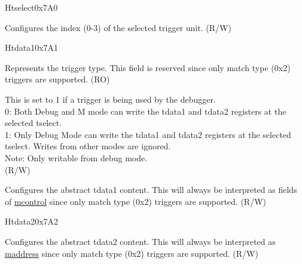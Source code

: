 \begin{register}{H}{tselect}{0x7A0}\label{regdesc:TSELECT}
%
%
\regnewline%
\begin{regdesc}\begin{reglist}
\label{fielddesc:TSELECT}\item [tselect] Configures the index (0-3) of the selected trigger unit. (R/W)
\end{reglist}\end{regdesc}
\end{register}

\begin{register}{H}{tdata1}{0x7A1}\label{regdesc:TDATA1}
%
%
%
\regnewline%
\begin{regdesc}\begin{reglist}
\label{fielddesc:TDATA1TYPE}\item [type] Represents the trigger type. This field is reserved since only match type (0x2) triggers are supported. (RO)
\label{fielddesc:TDATA1DMODE}\item [dmode] This is set to 1 if a trigger is being used by the debugger.\\
0: Both Debug and M mode can write the tdata1 and tdata2 registers at the selected tselect.\\
1: Only Debug Mode can write the tdata1 and tdata2 registers at the selected tselect. Writes from other modes are ignored.\\
Note: Only writable from debug mode.\\
(R/W)
\label{fielddesc:TDATA1DATA}\item [data] Configures the abstract tdata1 content. This will always be interpreted as fields of \hyperref[regdesc:MCONTROL]{mcontrol} since only match type (0x2) triggers are supported. (R/W)
\end{reglist}\end{regdesc}
\end{register}

\begin{register}{H}{tdata2}{0x7A2}\label{regdesc:TDATA2}
%
\regnewline%
\begin{regdesc}\begin{reglist}
\label{fielddesc:TDATA2}\item [tdata2] Configures the abstract tdata2 content. This will always be interpreted as \hyperref[regdesc:MADDRESS]{maddress} since only match type (0x2) triggers are supported. (R/W)
\end{reglist}\end{regdesc}
\end{register}

